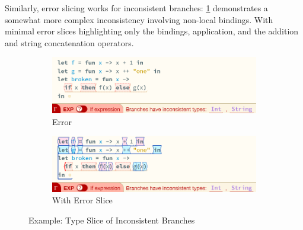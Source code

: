 Similarly, error slicing works for inconsistent branches: \cref{fig:InconsistentBranchesExample} demonstrates a somewhat more complex inconsistency involving non-local bindings. With minimal error slices highlighting only the bindings, application, and the addition \code{+} and string concatenation \code{++} operators.

\begin{figure}[h]
\centering
\begin{subfigure}{0.49\textwidth}
\centering
\includegraphics[width=1\textwidth]{Media/Figures/inconsistent_branches_example}
\caption{Error}
\end{subfigure}
\begin{subfigure}{0.49\textwidth}
\centering
\includegraphics[width=1\textwidth]{Media/Figures/inconsistent_branches_example_sliced}
\caption{With Error Slice}
\end{subfigure}
\caption{Example: Type Slice of Inconsistent Branches}
\label{fig:InconsistentBranchesExample}
\end{figure}


